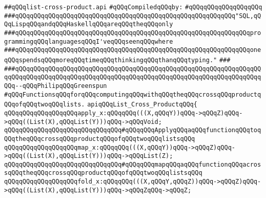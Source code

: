 \label{src/lib/src/list-cross-product.api}
\verb|##qQQqlist-cross-product.api|\newline
\newline
\verb|#qQQqCompiledqQQqby:|\newline
\verb|#qQQqqQQqqQQqqQQqqQQq|\newline
\newline
\newline
\newline
\verb|###qQQqqQQqqQQqqQQqqQQqqQQqqQQqqQQqqQQqqQQqqQQqqQQqqQQqqQQqqQQq"SQL,qQQqLispqQQqandqQQqHaskellqQQqareqQQqtheqQQqonly|\newline
\verb|###qQQqqQQqqQQqqQQqqQQqqQQqqQQqqQQqqQQqqQQqqQQqqQQqqQQqqQQqqQQqqQQqprogrammingqQQqlanguagesqQQqI'veqQQqseenqQQqwhere|\newline
\verb|###qQQqqQQqqQQqqQQqqQQqqQQqqQQqqQQqqQQqqQQqqQQqqQQqqQQqqQQqqQQqqQQqoneqQQqspendsqQQqmoreqQQqtimeqQQqthinkingqQQqthanqQQqtyping."|\newline
\verb|###|\newline
\verb|###qQQqqQQqqQQqqQQqqQQqqQQqqQQqqQQqqQQqqQQqqQQqqQQqqQQqqQQqqQQqqQQqqQQqqQQqqQQqqQQqqQQqqQQqqQQqqQQqqQQqqQQqqQQqqQQqqQQqqQQqqQQqqQQqqQQqqQQqqQQq--qQQqPhilipqQQqGreenspun|\newline
\newline
\newline
\verb|#qQQqFunctionsqQQqforqQQqcomputingqQQqwithqQQqtheqQQqcrossqQQqproductqQQqofqQQqtwoqQQqlists.|\newline
\newline
\verb|apiqQQqList_Cross_ProductqQQq{|\newline
\newline
\verb|qQQqqQQqqQQqqQQqqQQqapply_x:qQQqqQQq(((X,qQQqY))qQQq->qQQqZ)qQQq->qQQq((List(X),qQQqList(Y)))qQQq->qQQqVoid;|\newline
\verb|qQQqqQQqqQQqqQQqqQQqqQQqqQQqqQQq#qQQqqQQqApplyqQQqaqQQqfunctionqQQqtoqQQqtheqQQqcrossqQQqproductqQQqofqQQqtwoqQQqlistsqQQq|\newline
\newline
\verb|qQQqqQQqqQQqqQQqqQQqmap_x:qQQqqQQq(((X,qQQqY))qQQq->qQQqZ)qQQq->qQQq((List(X),qQQqList(Y)))qQQq->qQQqList(Z);|\newline
\verb|qQQqqQQqqQQqqQQqqQQqqQQqqQQqqQQq#qQQqqQQqmapqQQqaqQQqfunctionqQQqacrossqQQqtheqQQqcrossqQQqproductqQQqofqQQqtwoqQQqlistsqQQq|\newline
\newline
\verb|qQQqqQQqqQQqqQQqqQQqfold_x:qQQqqQQq(((X,qQQqY,qQQqZ))qQQq->qQQqZ)qQQq->qQQq((List(X),qQQqList(Y)))qQQq->qQQqZqQQq->qQQqZ;|\newline
